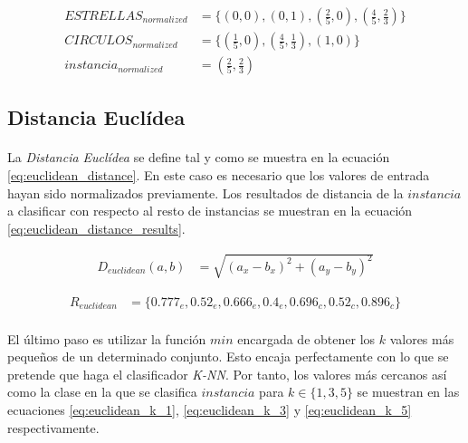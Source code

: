 \documentclass{article}
\begin{document}
		\begin{align}
		\label{eq:estrellas_normalized}
			ESTRELLAS_{normalized} &= \{(0,0), (0,1), (\tfrac{2}{5},0), (\tfrac{4}{5},\tfrac{2}{3})\} \\
		\label{eq:circulos_normalized}
			CIRCULOS_{normalized}  &= \{(\tfrac{1}{5},0), (\tfrac{4}{5},\tfrac{1}{3}), (1,0)\} \\
		\label{eq:instancia_normalized}
			instancia_{normalized}  &= (\tfrac{2}{5},\tfrac{2}{3})
		\end{align}

		\subsection{Distancia Euclídea}
		\label{sec:euclidean}

			\paragraph{}
			La \emph{Distancia Euclídea} se define tal y como se muestra en la ecuación \eqref{eq:euclidean_distance}. En este caso es necesario que los valores de entrada hayan sido normalizados previamente. Los resultados de distancia de la $instancia$ a clasificar con respecto al resto de instancias se muestran en la ecuación \eqref{eq:euclidean_distance_results}.

			\begin{align}
			\label{eq:euclidean_distance}
				D_{euclidean}(a,b) &= \sqrt{(a_x - b_x)^2 + (a_y - b_y)^2}
			\end{align}

			\begin{align}
			\label{eq:euclidean_distance_results}
				R_{euclidean} &= \{0.777_e, 0.52_e, 0.666_e, 0.4_e, 0.696_c, 0.52_c, 0.896_c\}
			\end{align}

			\paragraph{}
			El último paso es utilizar la función $min$ encargada de obtener los $k$ valores más pequeños de un determinado conjunto. Esto encaja perfectamente con lo que se pretende que haga el clasificador \emph{K-NN}. Por tanto, los valores más cercanos así como la clase en la que se clasifica $instancia$ para $k \in \{1,3,5\}$ se muestran en las ecuaciones \eqref{eq:euclidean_k_1}, \eqref{eq:euclidean_k_3} y \eqref{eq:euclidean_k_5} respectivamente.
\end{document}

